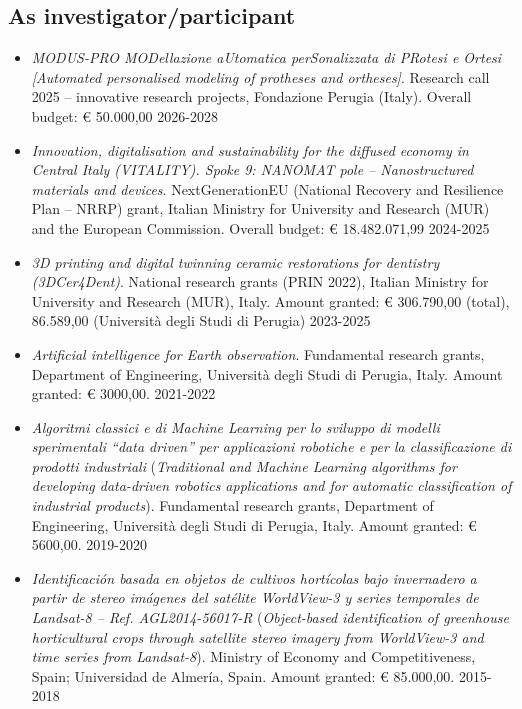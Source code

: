 \documentclass[11pt]{article}
\begin{document}
\subsection*{As investigator/participant}

\begin{itemize}

	\item \emph{MODUS-PRO MODellazione aUtomatica perSonalizzata di PRotesi e Ortesi [Automated personalised modeling of protheses and ortheses]}. Research call 2025 -- innovative research projects, Fondazione Perugia (Italy). Overall budget: € 50.000,00 \hfill 2026-2028

	\item \emph{Innovation, digitalisation and sustainability for the diffused economy in Central Italy (VITALITY). Spoke 9: NANOMAT pole -- Nanostructured materials and devices}. NextGenerationEU (National Recovery and Resilience Plan -- NRRP) grant, Italian Ministry for University and Research (MUR) and the European Commission. Overall budget: € 18.482.071,99 \hfill 2024-2025

	\item \emph{3D printing and digital twinning ceramic restorations for dentistry (3DCer4Dent)}. National research grants (PRIN 2022), Italian Ministry for University and Research (MUR), Italy. Amount granted: € 306.790,00 (total), 86.589,00 (Università degli Studi di Perugia) \hfill 2023-2025

	\item \emph{Artificial intelligence for Earth observation}. Fundamental research grants, Department of Engineering, Università degli Studi di Perugia, Italy. Amount granted: € 3000,00. \hfill 2021-2022
	
	\item \emph{Algoritmi  classici e  di Machine  Learning per lo sviluppo di modelli sperimentali ``data driven'' per applicazioni robotiche e per la classificazione di prodotti industriali} (\emph{Traditional and Machine Learning algorithms for developing data-driven robotics applications and for automatic classification of industrial products}). Fundamental research grants, Department of Engineering, Università degli Studi di Perugia, Italy. Amount granted: € 5600,00. \hfill 2019-2020
	
	\item \emph{Identificación basada en objetos de cultivos hortícolas bajo invernadero a partir de stereo imágenes del satélite WorldView-3 y series temporales de Landsat-8 -- Ref. AGL2014-56017-R} (\emph{Object-based identification of greenhouse horticultural crops through satellite stereo imagery from WorldView-3 and time series from Landsat-8}). Ministry of Economy and Competitiveness, Spain; Universidad de Almería, Spain. Amount granted: € 85.000,00. \hfill 2015-2018
	

\end{itemize}
\end{document}

